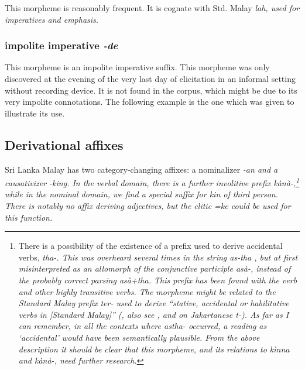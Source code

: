 This morpheme is reasonably frequent. It is cognate with  Std. Malay  \em lah, \em used for imperatives and emphasis.


\subsubsection{impolite imperative \em -de\em}\label{sec:morph:-de}
This morpheme is an impolite imperative suffix. This morpheme was only discovered at the evening of the very last day of elicitation in an informal setting without recording device. It is not found  in the corpus, which might be due to its very impolite connotations. The following example is the one which was given to illustrate its use.





\subsection{Derivational affixes}\label{sec:morph:Derivationalaffixes}
Sri Lanka Malay has two category-changing affixes: a nominalizer \em -an \em and a causativizer \em -king\em. In the verbal domain, there is a further involitive prefix \em kànà-\em,\footnote{There is a possibility of the existence of a prefix
	used to derive accidental verbs, \em tha-\em. This was overheard several times in the string \em as-tha \em, but at first misinterpreted as an allomorph of the conjunctive participle \em asà-\em, instead of the probably correct parsing \em asà+tha\em. This prefix has been found with the verb  and other highly transitive verbs. The morpheme might be related to the Standard Malay prefix \em ter- \em used to derive ``stative, accidental or habilitative verbs in [Standard Malay]'' (\citet{Paauw2004}, also see \citet{Adelaar2005struct}, and \citet[181]{Adelaar1985} on Jakartanese \em t\E-\em). As far as I can remember, in all the contexts where \em astha- \em occurred, a reading as `accidental' would have been semantically plausible. From the above description it should be clear that this morpheme, and its relations to \em kìnna \em {} and \em kànà-, \em {} need further research.}
while in the nominal domain, we find a special suffix for kin of third person.
There is notably no affix deriving adjectives, but the clitic \em =ke \em {} could be used for this function.

